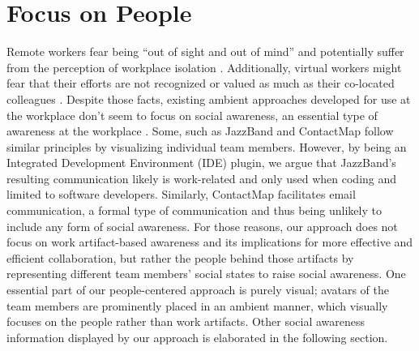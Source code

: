 \section{Focus on People}
Remote workers fear being \enquote{out of sight and out of mind} \autocite{bailey1999advantages} and potentially suffer from the perception of workplace isolation \autocite{mulki2009set, marshall2007workplace}. Additionally, virtual workers might fear that their efforts are not recognized or valued as much as their co-located colleagues \autocite{cooper2002telecommuting}. Despite those facts, existing ambient approaches developed for use at the workplace don't seem to focus on social awareness, an essential type of awareness at the workplace \autocite{greenberg1996awareness}. Some, such as JazzBand and ContactMap \autocite{cheng2003jazzing, whittaker2004contactmap} follow similar principles by visualizing individual team members. However, by being an Integrated Development Environment (IDE) plugin, we argue that JazzBand's resulting communication likely is work-related and only used when coding and limited to software developers. Similarly, ContactMap facilitates email communication, a formal type of communication and thus being unlikely to include any form of social awareness. For those reasons, our approach does not focus on work artifact-based awareness and its implications for more effective and efficient collaboration, but rather the people behind those artifacts by representing different team members' social states to raise social awareness. One essential part of our people-centered approach is purely visual; avatars of the team members are prominently placed in an ambient manner, which visually focuses on the people rather than work artifacts. Other social awareness information displayed by our approach is elaborated in the following section.

